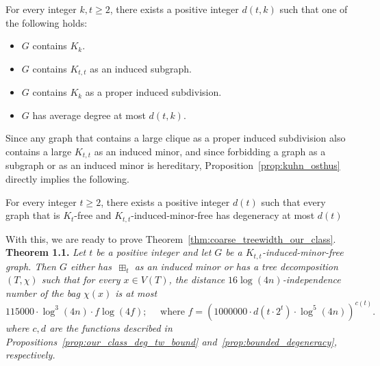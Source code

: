 \begin{proposition}\label{prop:kuhn_osthus}
    For every integer $k,t\geq 2$, there exists a positive integer $d(t,k)$ such that one of the following holds:
    \begin{itemize}
        \item $G$ contains $K_k$.
        \item $G$ contains $K_{t,t}$ as an induced subgraph.
        \item $G$ contains $K_k$ as a proper induced subdivision.
        \item $G$ has average degree at most $d(t,k)$.
    \end{itemize}
\end{proposition}

Since any graph that contains a large clique as a proper induced subdivision also contains a large $K_{t,t}$ as an induced minor, and since forbidding a graph as a subgraph or as an induced minor is hereditary, Proposition~\ref{prop:kuhn_osthus} directly implies the following.

\begin{proposition}\label{prop:bounded_degeneracy}
    For every integer $t\geq 2$, there exists a positive integer $d(t)$ such that every graph that is $K_t$-free and $K_{t,t}$-induced-minor-free has degeneracy at most $d(t)$
\end{proposition}

With this, we are ready to prove Theorem~\ref{thm:coarse_treewidth_our_class}.\\[-5pt]


\noindent\textbf{Theorem 1.1.}\emph{ Let $t$ be a positive integer and let $G$ be a $K_{t,t}$-induced-minor-free graph. Then $G$ either has $\, \boxplus_t$ as an induced minor or has a tree decomposition $(T,\chi)$ such that for every $x\in V(T)$, the distance $16\log (4n)$-independence number of the bag $\chi(x)$ is at most
$$
115000 \cdot \log^3 (4n) \cdot f \log (4f);\quad 
\text{ where }
f = (1000000\cdot d(t\cdot 2^t)\cdot \log^5 (4n))^{c(t)}.
$$
where $c,d$ are the functions described in Propositions~\ref{prop:our_class_deg_tw_bound} and~\ref{prop:bounded_degeneracy}, respectively.}

